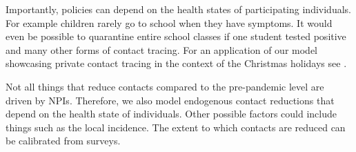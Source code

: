 Importantly, policies can depend on the health states of participating individuals. For
example children rarely go to school when they have symptoms. It would even be possible
to quarantine entire school classes if one student tested positive and many other forms
of contact tracing. For an application of our model showcasing private contact tracing in
the context of the Christmas holidays see \cite{Gabler2020}.

Not all things that reduce contacts compared to the pre-pandemic level are driven by
NPIs. Therefore, we also model endogenous contact reductions that depend on the health
state of individuals. Other possible factors could include things such as the local
incidence. The extent to which contacts are reduced can be calibrated from surveys.





